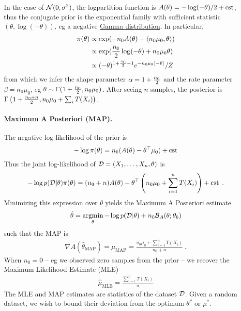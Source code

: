 \documentclass{article}
\newenvironment{example}{
	\begin{mdframed}[backgroundcolor=light-gray, roundcorner=5pt]
}{		
	\end{mdframed}
}
\newcommand{\logpart}{A}
\newcommand{\bregman}{\cB_\logpart}
\newcommand{\natp}{\theta}
\newcommand{\meanp}{\mu}
\begin{document}
\begin{example}
In the case of $\cN(0,\sigma^2)$, the logpartition function is $\logpart(\natp) = -\log(-\natp) /2 + \cst$, thus the conjugate prior is the exponential family with sufficient statistic $(\natp, \log(-\natp) )$, eg a negative \href{https://en.wikipedia.org/wiki/Gamma_distribution}{Gamma distribution}.
In particular,
\begin{align}
	\pi(\natp) 
	&\propto 
    \exp( -n_0 \logpart (\natp) 
    + \langle n_0 \mu_0, \natp \rangle ) \\
    &\propto \exp( \half[n_0] \log(-\natp) + n_0\mu_0 \natp ) \\
	&\propto (-\natp)^{1 + \half[n_0] -1 } e^{-n_0 \mu_0 (-\natp)} / Z
\end{align}
from which we infer the shape parameter $\alpha=1 + \half[n_0]$ and the rate parameter $\beta = n_0 \mu_0$, eg $\natp \sim \Gamma (1+\half[n_0] , n_0 \mu_0)$. After seeing $n$ samples, the posterior is $\Gamma\left(1+\half[n_0+n] , n_0 \mu_0 + \sum_i T(X_i) \right)$.
\end{example}

\paragraph{Maximum A Posteriori (MAP).}
The negative log-likelihood of the prior is
\begin{align*}
    -\log \pi(\natp) = n_0 (\logpart(\natp)  - \natp^\top \meanp_0 ) + \cst
\end{align*}
Thus the joint log-likelihood of $\cD =(X_1,\dots,X_n,\natp)$ is
\begin{align}
    -\log p(\cD|\natp)\pi(\natp) 
    = (n_0+n) \logpart (\natp) 
    - \theta^\top \left(n_0 \meanp_0 + \sum_{i=1}^n T(X_i) \right) + \cst \; .
\end{align}
Minimizing this expression over $\natp$ yields the Maximum A Posteriori estimate
\begin{align}
    \hat \natp = \argmin_\natp -\log p(\cD|\natp) + n_0 \bregman(\natp ; \natp_0)
\end{align}
such that the MAP is
\begin{align}
    \nabla \logpart(\hat \natp_\text{MAP}) = \hat \meanp_\text{MAP}
    = \frac{n_0 \meanp_0 + \sum_{i=1}^n T(X_i) }{n_0+n} \; .
\end{align}
When $n_0=0$ -- eg we observed zero samples from the prior -- we recover the Maximum Likelihood Estimate (MLE)
\begin{align}
	\hat \mu_\text{MLE} = \frac{\sum_{i=1}^n T(X_i)}{n}
\end{align}
The MLE and MAP estimates are statistics of the dataset $\cD$. Given a random dataset, we wish to bound their deviation from the optimum $\natp^*$ or $\meanp^*$.
\end{document}
